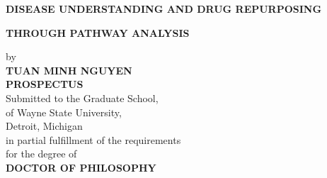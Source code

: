 \centerline{\uppercase{\bf Disease understanding and drug repurposing}}
\vspace{-0.4cm}
\centerline{\uppercase{\bf through pathway analysis}}

\vskip-0.4cm
\thispagestyle{empty}

\begin{center}
    \vspace{-0.4cm}
    by \\
    {\bf \uppercase{Tuan Minh Nguyen}}\\ %
    {\bf \uppercase{prospectus}}\\  %
    Submitted to the Graduate School,\\
    of Wayne State University,\\
    Detroit, Michigan\\
    in partial fulfillment of the requirements\\
    for the degree of\\
    {\bf DOCTOR OF PHILOSOPHY} %
\end{center}

